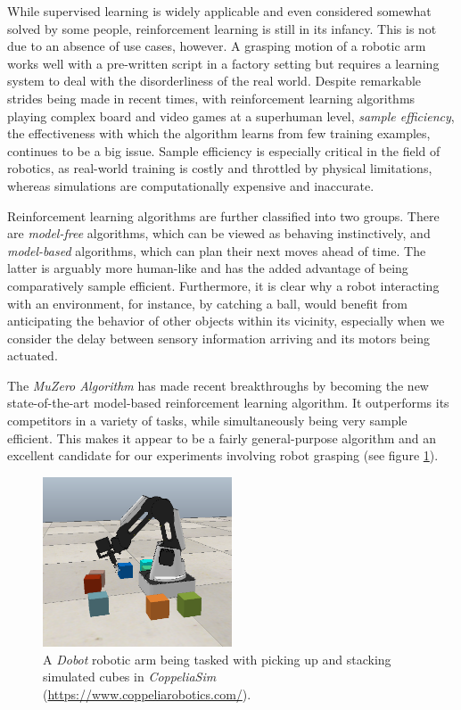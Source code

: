 While supervised learning is widely applicable and even considered somewhat solved by some people, reinforcement learning is still in its infancy. This is not due to an absence of use cases, however. A grasping motion of a robotic arm works well with a pre-written script in a factory setting but requires a learning system to deal with the disorderliness of the real world. Despite remarkable strides being made in recent times, with reinforcement learning algorithms playing complex board and video games at a superhuman level, \textit{sample efficiency}, the effectiveness with which the algorithm learns from few training examples, continues to be a big issue. Sample efficiency is especially critical in the field of robotics, as real-world training is costly and throttled by physical limitations, whereas simulations are computationally expensive and inaccurate.

Reinforcement learning algorithms are further classified into two groups. There are \textit{model-free} algorithms, which can be viewed as behaving instinctively, and \textit{model-based} algorithms, which can plan their next moves ahead of time. The latter is arguably more human-like and has the added advantage of being comparatively sample efficient. Furthermore, it is clear why a robot interacting with an environment, for instance, by catching a ball, would benefit from anticipating the behavior of other objects within its vicinity, especially when we consider the delay between sensory information arriving and its motors being actuated.

The \textit{MuZero Algorithm} \cite{muzero} has made recent breakthroughs by becoming the new state-of-the-art model-based reinforcement learning algorithm. It outperforms its competitors in a variety of tasks, while simultaneously being very sample efficient. This makes it appear to be a fairly general-purpose algorithm and an excellent candidate for our experiments involving robot grasping (see figure \ref{fig:cube_stacking}).
\begin{figure}[ht]
    \centering
    \includegraphics[width=0.5\textwidth]{assets/cube_stacking.png}
    \caption{A \textit{Dobot} robotic arm being tasked with picking up and stacking simulated cubes in \textit{CoppeliaSim} (\url{https://www.coppeliarobotics.com/}).}
    \label{fig:cube_stacking}
\end{figure}

